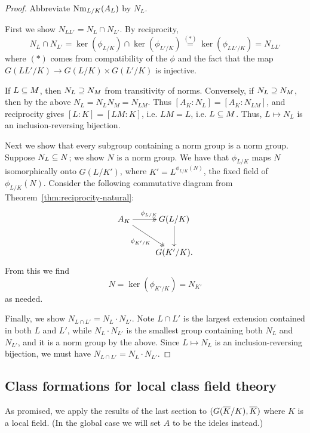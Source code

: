 \begin{proof}
Abbreviate $\operatorname{Nm}_{L/K}(A_L)$ by $N_L$.

First we show $N_{LL'}=N_L\cap N_{L'}$. %
By reciprocity,
\[
N_L\cap N_{L'}= \ker(\phi_{L/K})\cap \ker(\phi_{L'/K})\stackrel{(*)}=\ker(\phi_{LL'/K})=N_{LL'}\]
where $(*)$ comes from compatibility of the $\phi$ and the fact that the map $G(LL'/K)\to G(L/K)\times G(L'/K)$ is injective.

If $L\subseteq M$, then $N_L\supseteq N_M$ from transitivity of norms.
Conversely, if $N_L\supseteq N_M$, then by the above $N_L=N_LN_M=N_{LM}$. Thus $[A_K:N_L]=[A_K:N_{LM}]$, and reciprocity gives $[L:K]=[LM:K]$, i.e. $LM=L$, i.e. $L\subseteq M$. Thus, $L\mapsto N_L$ is an inclusion-reversing bijection.

Next we show that every subgroup containing a norm group is a norm group. Suppose $N_L\subseteq N$; we show $N$ is a norm group. We have that $\phi_{L/K}$ maps $N$ isomorphically onto $G(L/K')$, where $K'=L^{\phi_{L/K}(N)}$, the fixed field of $\phi_{L/K}(N)$. Consider the following commutative diagram from Theorem~\ref{thm:reciprocity-natural}:
\[
\xymatrix{
A_K\ar@{->>}[r]^{\phi_{L/K}} \ar@{->>}[rd]_{\phi_{K'/K}} & G(L/K)\ar[d]\\
&  G(K'/K).
}
\]
From this we find
\[
N=\ker(\phi_{K'/K})=N_{K'}
\]
as needed.

Finally, we show $N_{L\cap L'}=N_L\cdot N_{L'}$. Note $L\cap L'$ is the largest extension contained in both $L$ and $L'$, while $N_L\cdot N_{L'}$ is the smallest group containing both $N_L$ and $N_{L'}$, and it is a norm group by the above. Since $L\mapsto N_L$ is an inclusion-reversing bijection, we must have $N_{L\cap L'}=N_L\cdot N_{L'}$. 
\end{proof}
\subsection{Class formations for local class field theory}
As promised, we apply the results of the last section to $(G(\overline{K}/K),\overline{K})$ where $K$ is a local field. (In the global case we will set $A$ to be the ideles instead.)

